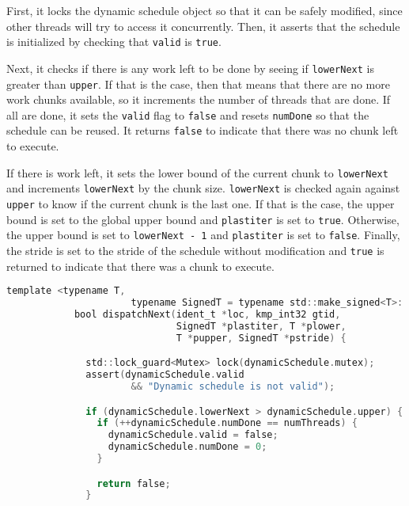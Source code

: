 \begin{itemize}
	      First, it locks the dynamic schedule object so that it can be safely modified, since
	      other threads will try to access it concurrently. Then, it asserts that the schedule
	      is initialized by checking that \texttt{valid} is \texttt{true}.

	      Next, it checks if there is any work left to be done by seeing if \texttt{lowerNext}
	      is greater than \texttt{upper}. If that is the case, then that means that there are no
	      more work chunks available, so it increments the number of threads that are done. If
	      all are done, it sets the \texttt{valid} flag to \texttt{false} and resets
	      \texttt{numDone} so that the schedule can be reused. It returns \texttt{false} to
	      indicate that there was no chunk left to execute.

	      If there is work left, it sets the lower bound of the current chunk to \texttt{lowerNext}
	      and increments \texttt{lowerNext} by the chunk size. \texttt{lowerNext} is checked
	      again against \texttt{upper} to know if the current chunk is the last one. If that is
	      the case, the upper bound is set to the global upper bound and \texttt{plastiter} is
	      set to \texttt{true}. Otherwise, the upper bound is set to \texttt{lowerNext - 1} and
	      \texttt{plastiter} is set to \texttt{false}. Finally, the stride is set to the stride
	      of the schedule without modification and \texttt{true} is returned to indicate that
	      there was a chunk to execute.

	      \begin{lstlisting}[language=C, caption={void Team::dispatchNext},
          label={lst:team-dispatchnext}, escapechar=@]
            template <typename T,
                      typename SignedT = typename std::make_signed<T>::type>
            bool dispatchNext(ident_t *loc, kmp_int32 gtid,
                              SignedT *plastiter, T *plower,
                              T *pupper, SignedT *pstride) {

              std::lock_guard<Mutex> lock(dynamicSchedule.mutex);
              assert(dynamicSchedule.valid
                      && "Dynamic schedule is not valid");

              if (dynamicSchedule.lowerNext > dynamicSchedule.upper) {
                if (++dynamicSchedule.numDone == numThreads) {
                  dynamicSchedule.valid = false;
                  dynamicSchedule.numDone = 0;
                }

                return false;
              }


\end{lstlisting}
\end{itemize}
